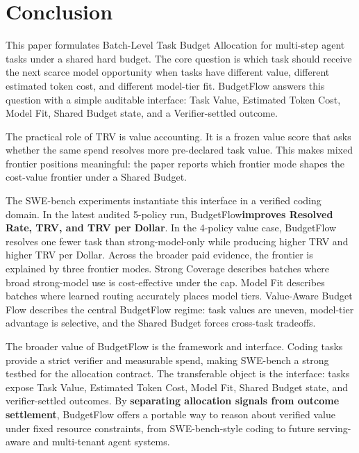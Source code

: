 \documentclass[sigconf,review,anonymous]{acmart}
\newcommand{\method}{BudgetFlow\xspace}
\newcommand{\trv}{TRV\xspace}
\newcommand{\taskvalue}{Task Value\xspace}
\newcommand{\tokencost}{Estimated Token Cost\xspace}
\newcommand{\modelfit}{Model Fit\xspace}
\newcommand{\sharedbudget}{Shared Budget\xspace}
\newcommand{\verifier}{Verifier\xspace}
\begin{document}
\section{Conclusion}
This paper formulates Batch-Level Task Budget Allocation for multi-step agent tasks under a shared hard budget. The core question is which task should receive the next scarce model opportunity when tasks have different value, different estimated token cost, and different model-tier fit. \method answers this question with a simple auditable interface: \taskvalue, \tokencost, \modelfit, \sharedbudget state, and a \verifier-settled outcome.

The practical role of \trv is value accounting. It is a frozen value score that asks whether the same spend resolves more pre-declared task value. This makes mixed frontier positions meaningful: the paper reports which frontier mode shapes the cost-value frontier under a \sharedbudget.

The SWE-bench experiments instantiate this interface in a verified coding domain. In the latest audited 5-policy run, \method \textbf{improves Resolved Rate, \trv, and \trv per Dollar}. In the 4-policy value case, \method resolves one fewer task than strong-model-only while producing higher \trv and higher \trv per Dollar. Across the broader paid evidence, the frontier is explained by three frontier modes. Strong Coverage describes batches where broad strong-model use is cost-effective under the cap. Model Fit describes batches where learned routing accurately places model tiers. Value-Aware Budget Flow describes the central \method regime: task values are uneven, model-tier advantage is selective, and the \sharedbudget forces cross-task tradeoffs.

The broader value of \method is the framework and interface. Coding tasks provide a strict verifier and measurable spend, making SWE-bench a strong testbed for the allocation contract. The transferable object is the interface: tasks expose \taskvalue, \tokencost, \modelfit, \sharedbudget state, and verifier-settled outcomes. By \textbf{separating allocation signals from outcome settlement}, BudgetFlow offers a portable way to reason about verified value under fixed resource constraints, from SWE-bench-style coding to future serving-aware and multi-tenant agent systems.



\end{document}
